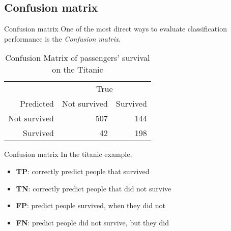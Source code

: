 \documentclass[10pt]{beamer}\usepackage[]{graphicx}\usepackage[]{xcolor}
\begin{document}



\subsection{Confusion matrix}

\begin{frame}[fragile]{Confusion matrix}
One of the most direct ways to evaluate classification performance is the \emph{Confusion matrix}.
\begin{table}[ht]
\centering
\begin{tabular}{rrr}
  \hline
  & \multicolumn{2}{c}{True} \\
 Predicted & Not survived & Survived \\
 \hline
Not survived & 507 & 144 \\ 
  Survived & 42 & 198 \\ 
   \hline
\end{tabular}
\caption{Confusion Matrix of passengers' survival on the
Titanic} 
\end{table}


\end{frame}


\begin{frame}[fragile]{Confusion matrix}
In the titanic example,
\begin{itemize}
\item \textbf{TP}: correctly predict people that survived
\item \textbf{TN}: correctly predict people that did not survive
\item \textbf{FP}: predict people survived, when they did not 
\item \textbf{FN}: predict people did not survive, but they did
\end{itemize}

\end{frame}

\end{document}
